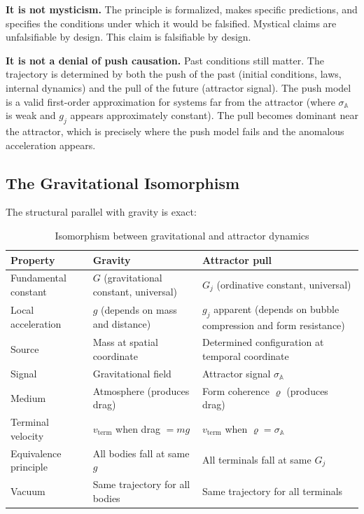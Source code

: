 \documentclass[12pt,a4paper]{article}
\newcommand{\gj}{g_j}
\newcommand{\Gj}{G_j}
\newcommand{\rhof}{\varrho}
\begin{document}
\textbf{It is not mysticism.} The principle is formalized, makes specific predictions, and specifies the conditions under which it would be falsified. Mystical claims are unfalsifiable by design. This claim is falsifiable by design.

\textbf{It is not a denial of push causation.} Past conditions still matter. The trajectory is determined by both the push of the past (initial conditions, laws, internal dynamics) and the pull of the future (attractor signal). The push model is a valid first-order approximation for systems far from the attractor (where $\sigma_{\mathbb{A}}$ is weak and $\gj$ appears approximately constant). The pull becomes dominant near the attractor, which is precisely where the push model fails and the anomalous acceleration appears.

\subsection{The Gravitational Isomorphism}

The structural parallel with gravity is exact:

\begin{table}[H]
\centering
\caption{Isomorphism between gravitational and attractor dynamics}
\label{tab:gravity}
\begin{tabularx}{\textwidth}{@{}lXX@{}}
\toprule
\textbf{Property} & \textbf{Gravity} & \textbf{Attractor pull} \\
\midrule
Fundamental constant & $G$ (gravitational constant, universal) & $\Gj$ (ordinative constant, universal) \\
Local acceleration & $g$ (depends on mass and distance) & $\gj$ apparent (depends on bubble compression and form resistance) \\
Source & Mass at spatial coordinate & Determined configuration at temporal coordinate \\
Signal & Gravitational field & Attractor signal $\sigma_{\mathbb{A}}$ \\
Medium & Atmosphere (produces drag) & Form coherence $\rhof$ (produces drag) \\
Terminal velocity & $v_{\mathrm{term}}$ when drag $= mg$ & $v_{\mathrm{term}}$ when $\rhof = \sigma_{\mathbb{A}}$ \\
Equivalence principle & All bodies fall at same $g$ & All terminals fall at same $\Gj$ \\
Vacuum & Same trajectory for all bodies & Same trajectory for all terminals \\
\bottomrule
\end{tabularx}
\end{table}
\end{document}
